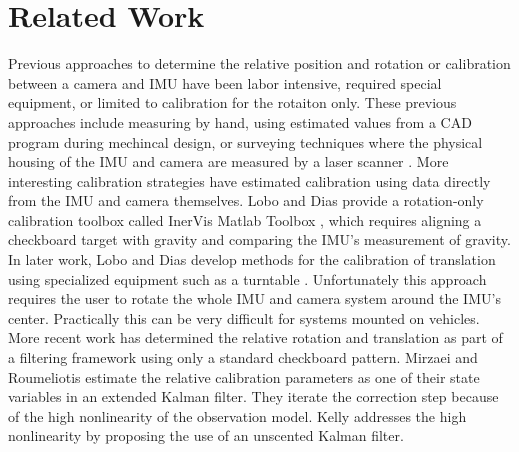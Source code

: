 \section{Related Work}
\label{sec:related_work}

Previous approaches to determine the relative position and rotation or calibration between a camera and IMU have been labor intensive, required special equipment, or limited to calibration for the rotaiton only. These previous approaches include measuring by hand, using estimated values from a CAD program during mechincal design, or surveying techniques where the physical housing of the IMU and camera are measured by a laser scanner \cite{Johnson_fieldtesting}.  More interesting calibration strategies have estimated calibration using data directly from the IMU and camera themselves. Lobo and Dias provide a rotation-only calibration toolbox called InerVis Matlab Toolbox \cite{InerVis}, which requires aligning a checkboard target with gravity and comparing the IMU's measurement of gravity. In later work, Lobo and Dias develop methods for the calibration of translation using specialized equipment such as a turntable  \cite{lobo2007relative}. Unfortunately this approach requires the user to rotate the whole IMU and camera system around the IMU's center. Practically this can be very difficult for systems mounted on vehicles. More recent work has determined the relative rotation and translation as part of a filtering framework using only a standard checkboard pattern.  Mirzaei and Roumeliotis \cite{mirzaei2008kalman} estimate the relative calibration parameters as one of their state variables in an extended Kalman filter. They iterate the correction step because of the high nonlinearity of the observation model. Kelly \cite{2011:kelly:article} addresses the high nonlinearity by proposing the use of an unscented Kalman filter. 